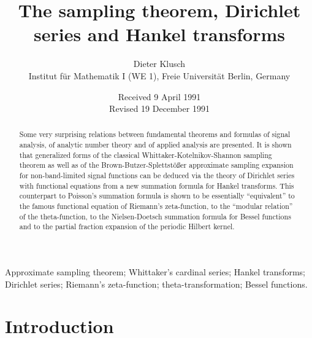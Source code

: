 \documentclass{article}
\newcommand{\tmaffiliation}[1]{\\ #1}
\newcommand{\tmtextbf}[1]{\text{{\bfseries{#1}}}}
\begin{document}
\title{The sampling theorem, Dirichlet series and Hankel transforms}

\author{
  Dieter Klusch
  \tmaffiliation{Institut f{\"u}r Mathematik I (WE 1), Freie Universit{\"a}t
  Berlin, Germany}
}

\date{Received 9 April 1991\\
Revised 19 December 1991}

\maketitle

\begin{abstract}
  Some very surprising relations between fundamental theorems and formulas of
  signal analysis, of analytic number theory and of applied analysis are
  presented. It is shown that generalized forms of the classical
  Whittaker-Kotelnikov-Shannon sampling theorem as well as of the
  Brown-Butzer-Splettst{\"o}{\ss}er approximate sampling expansion for
  non-band-limited signal functions can be deduced via the theory of Dirichlet
  series with functional equations from a new summation formula for Hankel
  transforms. This counterpart to Poisson's summation formula is shown to be
  essentially ``equivalent'' to the famous functional equation of Riemann's
  zeta-function, to the ``modular relation'' of the theta-function, to the
  Nielsen-Doetsch summation formula for Bessel functions and to the partial
  fraction expansion of the periodic Hilbert kernel.
\end{abstract}

{\noindent}\tmtextbf{Keywords:} Approximate sampling theorem; Whittaker's
cardinal series; Hankel transforms; Dirichlet series; Riemann's zeta-function;
theta-transformation; Bessel functions.

{\tableofcontents}

\section{Introduction}\label{sec:intro}
\end{document}
